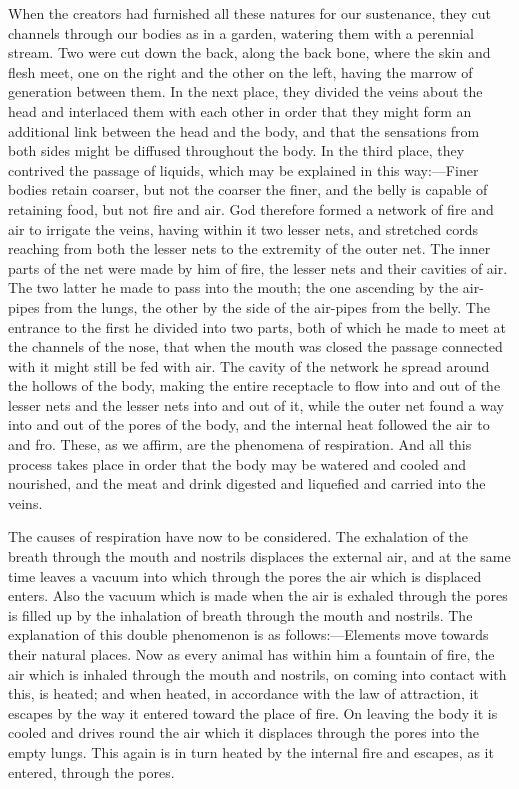 When the creators had furnished all these natures for our sustenance, they
cut channels through our bodies as in a garden, watering them with a
perennial stream. Two were cut down the back, along the back bone, where
the skin and flesh meet, one on the right and the other on the left,
having the marrow of generation between them. In the next place, they
divided the veins about the head and interlaced them with each other in
order that they might form an additional link between the head and the
body, and that the sensations from both sides might be diffused throughout
the body. In the third place, they contrived the passage of liquids, which
may be explained in this way:—Finer bodies retain coarser, but not
the coarser the finer, and the belly is capable of retaining food, but not
fire and air. God therefore formed a network of fire and air to irrigate
the veins, having within it two lesser nets, and stretched cords reaching
from both the lesser nets to the extremity of the outer net. The inner
parts of the net were made by him of fire, the lesser nets and their
cavities of air. The two latter he made to pass into the mouth; the one
ascending by the air-pipes from the lungs, the other by the side of the
air-pipes from the belly. The entrance to the first he divided into two
parts, both of which he made to meet at the channels of the nose, that
when the mouth was closed the passage connected with it might still be fed
with air. The cavity of the network he spread around the hollows of the
body, making the entire receptacle to flow into and out of the lesser nets
and the lesser nets into and out of it, while the outer net found a way
into and out of the pores of the body, and the internal heat followed the
air to and fro. These, as we affirm, are the phenomena of respiration. And
all this process takes place in order that the body may be watered and
cooled and nourished, and the meat and drink digested and liquefied and
carried into the veins.

The causes of respiration have now to be considered. The exhalation of the
breath through the mouth and nostrils displaces the external air, and at
the same time leaves a vacuum into which through the pores the air which
is displaced enters. Also the vacuum which is made when the air is exhaled
through the pores is filled up by the inhalation of breath through the
mouth and nostrils. The explanation of this double phenomenon is as
follows:—Elements move towards their natural places. Now as every
animal has within him a fountain of fire, the air which is inhaled through
the mouth and nostrils, on coming into contact with this, is heated; and
when heated, in accordance with the law of attraction, it escapes by the
way it entered toward the place of fire. On leaving the body it is cooled
and drives round the air which it displaces through the pores into the
empty lungs. This again is in turn heated by the internal fire and
escapes, as it entered, through the pores.


